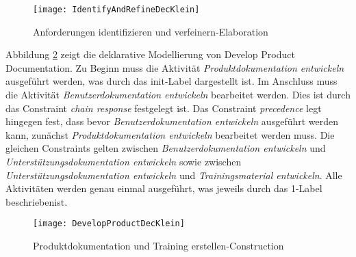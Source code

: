 \begin{figure}[h]
\begin{center}
  \texttt{[image: IdentifyAndRefineDecKlein]} %
  \caption{Anforderungen identifizieren und verfeinern-Elaboration}
  \label{fig:IdentifyAndRefineDecKlein}
\end{center}
\end{figure}



Abbildung \ref{fig:DevelopProductDecKlein} zeigt die deklarative Modellierung von Develop Product Documentation.\newline
Zu Beginn muss die Aktivität \textit{Produktdokumentation entwickeln} ausgeführt werden, was durch das init-Label dargestellt ist. Im Anschluss muss die Aktivität \textit{Benutzerdokumentation entwickeln} bearbeitet werden. Dies ist durch das Constraint \textit{chain response} festgelegt ist. Das Constraint \textit{precedence} legt hingegen fest, dass bevor \textit{Benutzerdokumentation entwickeln} ausgeführt werden kann, zunächst \textit{Produktdokumentation entwickeln} bearbeitet werden muss. Die gleichen Constraints gelten zwischen \textit{Benutzerdokumentation entwickeln} und \textit{Unterstützungsdokumentation entwickeln} sowie zwischen \textit{Unterstützungsdokumentation entwickeln} und \textit{Trainingsmaterial entwickeln}. Alle Aktivitäten werden genau einmal ausgeführt, was jeweils durch das 1-Label beschriebenist. 

\begin{figure}[htp]
\begin{center}
  \texttt{[image: DevelopProductDecKlein]} %
  \caption{Produktdokumentation und Training erstellen-Construction}
  \label{fig:DevelopProductDecKlein}
\end{center}
\end{figure}

